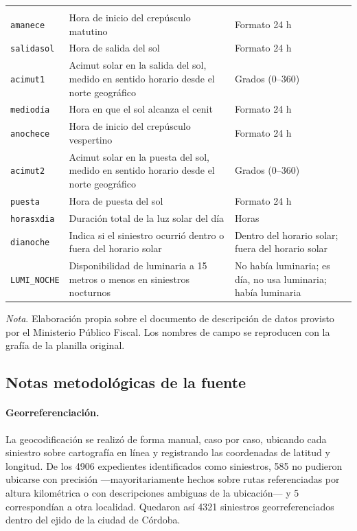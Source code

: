 \begin{longtable}{@{}>{\raggedright\arraybackslash}p{}
                    >{\raggedright\arraybackslash}p{}
                    >{\raggedright\arraybackslash}p{}@{}}
\multicolumn{3}{@{}l}{\textit{Condiciones solares y de luminosidad}} \\
\addlinespace
\texttt{amanece} & Hora de inicio del crepúsculo matutino & Formato 24 h \\
\texttt{salidasol} & Hora de salida del sol & Formato 24 h \\
\texttt{acimut1} & Acimut solar en la salida del sol, medido en sentido horario desde el norte geográfico & Grados (0--360) \\
\texttt{mediodía} & Hora en que el sol alcanza el cenit & Formato 24 h \\
\texttt{anochece} & Hora de inicio del crepúsculo vespertino & Formato 24 h \\
\texttt{acimut2} & Acimut solar en la puesta del sol, medido en sentido horario desde el norte geográfico & Grados (0--360) \\
\texttt{puesta} & Hora de puesta del sol & Formato 24 h \\
\texttt{horasxdia} & Duración total de la luz solar del día & Horas \\
\texttt{dianoche} & Indica si el siniestro ocurrió dentro o fuera del horario solar & Dentro del horario solar; fuera del horario solar \\
\texttt{LUMI\_NOCHE} & Disponibilidad de luminaria a 15 metros o menos en siniestros nocturnos & No había luminaria; es día, no usa luminaria; había luminaria \\
\end{longtable}

{\footnotesize \textit{Nota}. Elaboración propia sobre el documento de descripción de
datos provisto por el Ministerio Público Fiscal. Los nombres de campo se reproducen
con la grafía de la planilla original.}

\subsection{Notas metodológicas de la fuente}
\label{ssec:notas-fuente}

\paragraph{Georreferenciación.} La geocodificación se realizó de forma manual, caso por
caso, ubicando cada siniestro sobre cartografía en línea y registrando las coordenadas
de latitud y longitud. De los 4906 expedientes identificados como siniestros, 585 no
pudieron ubicarse con precisión ---mayoritariamente hechos sobre rutas referenciadas por
altura kilométrica o con descripciones ambiguas de la ubicación--- y 5 correspondían a
otra localidad. Quedaron así 4321 siniestros georreferenciados dentro del ejido de la
ciudad de Córdoba.

